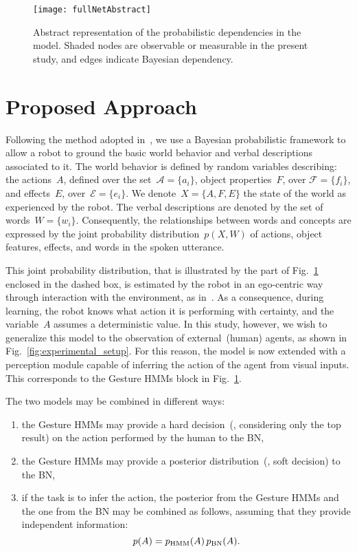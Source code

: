 
\begin{figure}
  \centering
  \texttt{[image: fullNetAbstract]}
  \caption{Abstract representation of the probabilistic dependencies in the model. Shaded nodes are observable or measurable in the present study, and edges indicate Bayesian dependency.}
  \label{fig:model}
\end{figure}

\section{Proposed Approach}
Following the method adopted in~\cite{salvi:2012:smcb}, we use a Bayesian probabilistic framework to allow a robot to ground the basic world behavior and verbal descriptions associated to it. The world behavior is defined by random variables describing: the actions~$A$, defined over the set~$\mathcal{A} = \{a_i\}$, object properties~$F$, over $\mathcal{F} = \{f_i\}$, and effects~$E$, over~$\mathcal{E} = \{e_i\}$. We denote~$X = \{A, F, E\}$ the state of the world as experienced by the robot. The verbal descriptions are denoted by the set of words~$W = \{w_i\}$. Consequently, the relationships between words and concepts are expressed by the joint probability distribution~$p(X,W)$ of actions, object features, effects, and words in the spoken utterance.

This joint probability distribution, that is illustrated by the part of Fig.~\ref{fig:model} enclosed in the dashed box, is estimated by the robot in an ego-centric way through interaction with the environment, as in~\cite{salvi:2012:smcb}. As a consequence, during learning, the robot knows what action it is performing with certainty, and the variable~$A$ assumes a deterministic value. In this study, however, we wish to generalize this model to the observation of external~(human) agents, as shown in Fig.~\ref{fig:experimental_setup}. For this reason, the model is now extended with a perception module capable of inferring the action of the agent from visual inputs. This corresponds to the Gesture \acp{HMM} block in Fig.~\ref{fig:model}.

The two models may be combined in different ways:
\begin{enumerate}
\item the Gesture \acp{HMM} may provide a hard decision~(\ie, considering only the top result) on the action performed by the human to the \ac{BN},

\item the Gesture \acp{HMM} may provide a posterior distribution~(\ie, soft decision) to the \ac{BN},

\item if the task is to infer the action, the posterior from the Gesture \acp{HMM} and the one from the \ac{BN} may be combined as follows, assuming that they provide independent information:
\begin{equation*}
p(A) = p_{\text{HMM}}(A) \, p_{\text{BN}}(A).
\end{equation*}
\end{enumerate}

